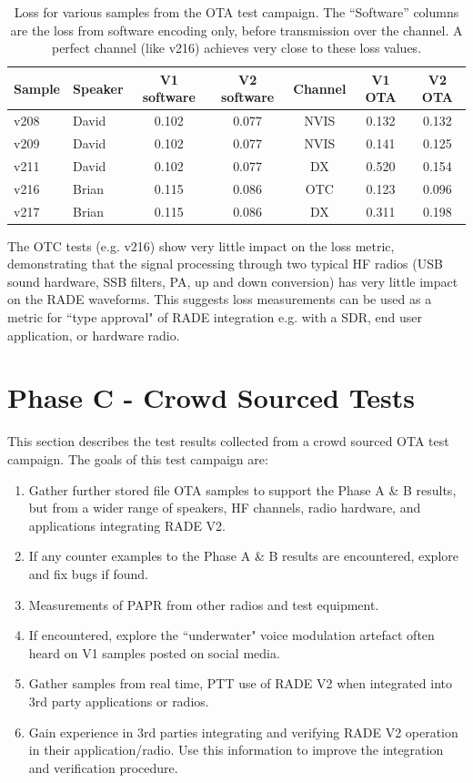 \documentclass{article}
\begin{document}
\begin{table} [h]
\caption{Loss for various samples from the OTA test campaign. The “Software” columns are the loss from software encoding only, before transmission over the channel. A perfect channel (like v216) achieves very close to these loss values.}
\label{tab:ota_loss}
\centering
\begin{tabular}{ l | l | c | c | c | c | c }
 \hline
 Sample	& Speaker & V1 software & V2 software & Channel & V1 OTA & V2 OTA \\
 \hline
 v208 &	David &	0.102 &	0.077 &	NVIS & 0.132 & 0.132 \\
 v209 &	David &	0.102 &	0.077 &	NVIS & 0.141 & 0.125 \\
 v211 &	David & 0.102 &	0.077 &	DX   & 0.520 & 0.154 \\
 v216 &	Brian &	0.115 &	0.086 &	OTC  & 0.123 & 0.096 \\
 v217 &	Brian &	0.115 &	0.086 &	DX   & 0.311 & 0.198 \\
 \hline
\end{tabular}
\end{table}

The OTC tests (e.g. v216) show very little impact on the loss metric, demonstrating that the signal processing through two typical HF radios (USB sound hardware, SSB filters, PA, up and down conversion) has very little impact on the RADE waveforms. This suggests loss measurements can be used as a metric for ``type approval" of RADE integration e.g. with a SDR, end user application, or hardware radio.

\section{Phase C - Crowd Sourced Tests}

This section describes the test results collected from a crowd sourced OTA test campaign. The goals of this test campaign are:
\begin{enumerate}
\item Gather further stored file OTA samples to support the Phase A \& B results, but from a wider range of speakers, HF channels, radio hardware, and applications integrating RADE V2.
\item If any counter examples to the Phase A \& B results are encountered, explore and fix bugs if found.
\item Measurements of PAPR from other radios and test equipment.
\item If encountered, explore the ``underwater" voice modulation artefact often heard on V1 samples posted on social media.
\item Gather samples from real time, PTT use of RADE V2 when integrated into 3rd party applications or radios.
\item Gain experience in 3rd parties integrating and verifying RADE V2 operation in their application/radio. Use this information to improve the integration and verification procedure.
\end{enumerate}
\end{document}
